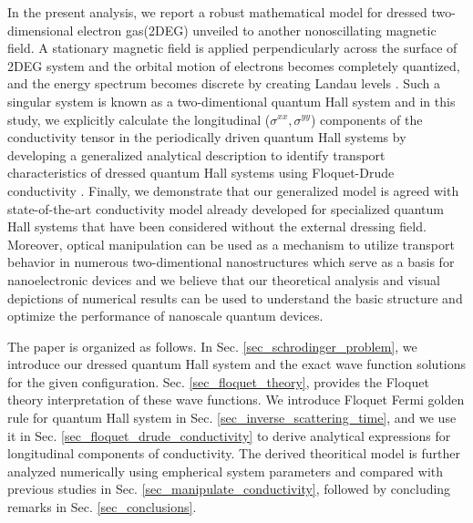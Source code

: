 In the present analysis, we report a robust mathematical model for dressed two-dimensional electron gas(2DEG) unveiled to another nonoscillating magnetic field.
A stationary magnetic field is applied perpendicularly across the surface of 2DEG system and the orbital motion of electrons becomes completely quantized, and the energy spectrum becomes discrete by creating Landau levels \cite{landau30}.
Such a singular system is known as a two-dimentional quantum Hall system and in this study, we explicitly calculate the longitudinal  ($\sigma^{xx},\sigma^{yy}$) components of the conductivity tensor in the periodically driven quantum Hall systems by developing a generalized analytical description to identify transport characteristics of dressed quantum Hall systems using Floquet-Drude conductivity \cite{wackerl20}.
Finally, we demonstrate that our generalized model is agreed with state-of-the-art conductivity model \cite{endo09} already developed for specialized quantum Hall systems that have been considered without the external dressing field. 
Moreover, optical manipulation can be used as a mechanism to utilize transport behavior in numerous two-dimentional nanostructures which serve as a basis for nanoelectronic devices and we believe that our theoretical analysis and visual depictions of numerical results can be used to understand the basic structure and optimize the performance of nanoscale quantum devices.

The paper is organized as follows. In Sec.  \ref{sec_schrodinger_problem}, we introduce our dressed quantum Hall system and the exact wave function solutions for the given configuration. Sec. \ref{sec_floquet_theory}, provides the Floquet theory interpretation of these wave functions.
We introduce Floquet Fermi golden rule for quantum Hall system in Sec. \ref{sec_inverse_scattering_time}, and we use it in Sec. \ref{sec_floquet_drude_conductivity} to derive analytical expressions for longitudinal components of conductivity.
The derived theoritical model is further analyzed numerically using empherical system parameters and compared with previous studies in Sec. \ref{sec_manipulate_conductivity}, followed by concluding remarks in Sec. \ref{sec_conclusions}.
